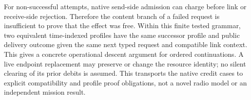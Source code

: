 \documentclass{article}
\begin{document}
For non-successful attempts, native send-side admission can charge
before link or receive-side rejection. Therefore the content
branch of a failed request is insufficient to prove that the
effect was free. Within this finite tested grammar, two
equivalent time-indexed profiles have the same successor profile
and public delivery outcome given the same next typed request
and compatible link context. This gives a concrete operational
descent argument for ordered continuations. A live endpoint
replacement may preserve or change the resource identity; no
silent clearing of its prior debits is assumed. This transports
the native credit cases to explicit compatibility and profile
proof obligations, not a novel radio model or an independent
mission result.
\end{document}
